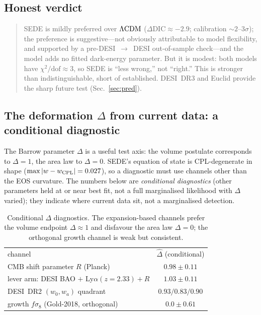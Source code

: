 \subsection{Honest verdict}
\begin{quote}
SEDE is mildly preferred over $\Lambda\mathrm{CDM}$ ($\Delta\mathrm{DIC}\approx-2.9$; calibration $\sim2$--$3\sigma$);
the preference is suggestive---not obviously attributable to model flexibility, and supported by a
pre-DESI~$\to$~DESI out-of-sample check---and the model adds no fitted dark-energy parameter. But it is
modest: both models have $\chi^2/\mathrm{dof}\approx3$, so SEDE is ``less wrong,'' not ``right.'' This
is stronger than indistinguishable, short of established. DESI~DR3 and Euclid provide the sharp future
test (Sec.~\ref{sec:pred}).
\end{quote}

\subsection{The deformation $\Delta$ from current data: a conditional diagnostic}
The Barrow parameter $\Delta$ is a useful test axis: the volume postulate corresponds to $\Delta=1$,
the area law to $\Delta=0$. SEDE's equation of state is CPL-degenerate in shape
($\max|w-w_{\rm CPL}|=0.027$), so a diagnostic must use channels other than the EOS curvature. The
numbers below are \emph{conditional diagnostics} (other parameters held at or near best fit, not a full
marginalised likelihood with $\Delta$ varied); they indicate where current data sit, not a marginalised
detection.

\begin{table}[t]
\caption{Conditional $\Delta$ diagnostics. The expansion-based channels prefer the volume endpoint
$\Delta\approx1$ and disfavour the area law $\Delta=0$; the orthogonal growth channel is weak but
consistent.}\label{tab:delta}
\begin{ruledtabular}
\begin{tabular}{lc}
channel & $\hat\Delta$ (conditional) \\ \colrule
CMB shift parameter $R$ (Planck) & $0.98\pm0.11$ \\
lever arm: DESI BAO $+$ Ly$\alpha(z{=}2.33)+R$ & $1.03\pm0.11$ \\
DESI~DR2 $(w_0,w_a)$ quadrant & $0.93/0.83/0.90$ \\
growth $f\sigma_8$ (Gold-2018, orthogonal) & $0.0\pm0.61$ \\
\end{tabular}
\end{ruledtabular}
\end{table}

